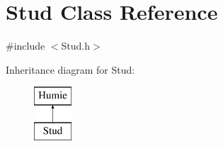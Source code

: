 \hypertarget{class_stud}{}\section{Stud Class Reference}
\label{class_stud}


{\ttfamily \#include $<$Stud.\+h$>$}

Inheritance diagram for Stud\+:\begin{figure}[H]
\begin{center}
\leavevmode
\includegraphics[height=2.000000cm]{d4/d17/class_stud}
\end{center}
\end{figure}

